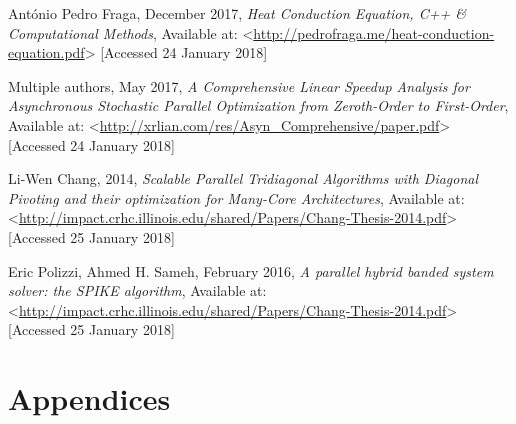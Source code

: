 \documentclass[12pt]{article}
\begin{document}
\newpage
\begin{thebibliography}{0}

António Pedro Fraga, December 2017, \textit{Heat Conduction Equation, C++ \& Computational Methods}, Available at: <\url{http://pedrofraga.me/heat-conduction-equation.pdf}> [Accessed 24 January 2018]

Multiple authors, May 2017, \textit{A Comprehensive Linear Speedup Analysis for Asynchronous Stochastic Parallel Optimization from Zeroth-Order to First-Order}, Available at: <\url{http://xrlian.com/res/Asyn_Comprehensive/paper.pdf}> [Accessed 24 January 2018]

Li-Wen Chang, 2014, \textit{Scalable Parallel Tridiagonal Algorithms with Diagonal Pivoting and their optimization for Many-Core Architectures}, Available at: <\url{http://impact.crhc.illinois.edu/shared/Papers/Chang-Thesis-2014.pdf}> [Accessed 25 January 2018]

Eric Polizzi, Ahmed H. Sameh, February 2016, \textit{A parallel hybrid banded system solver: the SPIKE algorithm}, Available at: <\url{http://impact.crhc.illinois.edu/shared/Papers/Chang-Thesis-2014.pdf}> [Accessed 25 January 2018]


\end{thebibliography}
\newpage

\section*{Appendices}
\end{document}

